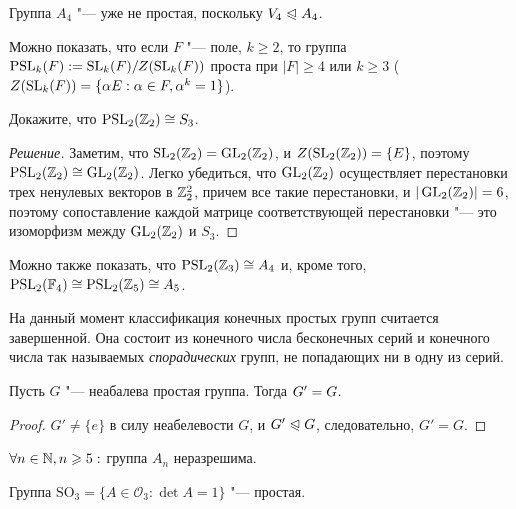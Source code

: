 \begin{note}
	Группа $A_4$ "--- уже не простая, поскольку $V_4 \trianglelefteqslant A_4$.
\end{note}

\begin{note}
	Можно показать, что если $F$ "--- поле, $k \ge 2$, то группа $\PSL_k(F) \hm{:=} \SL_k(F) / Z(\SL_k(F))$ проста при $|F| \ge 4$ или $k \ge 3$ ($Z(\operatorname{SL}_k(F)) = \{\alpha E: \alpha \in F, \alpha^k = 1\}$).
\end{note}

\begin{exercise}
	Докажите, что $\operatorname{PSL}_2(\mathbb{Z}_2) \cong S_3$.
\end{exercise}

\begin{proof}[Решение]
	Заметим, что $\operatorname{SL}_2(\mathbb{Z}_2)  = \operatorname{GL}_2(\mathbb{Z}_2)$, и $Z(\operatorname{SL}_2(\mathbb{Z}_2)) = \{E\}$, поэтому $\PSL_2(\Z_2) \hm\cong \GL_2(\Z_2)$. Легко убедиться, что $\operatorname{GL}_2(\mathbb{Z}_2)$ осуществляет перестановки трех ненулевых векторов в $\mathbb{Z}_2^2$, причем все такие перестановки, и $|\operatorname{GL}_2(\mathbb{Z}_2)| = 6$, поэтому сопоставление каждой матрице соответствующей перестановки "--- это изоморфизм между $\operatorname{GL}_2(\mathbb{Z}_2)$ и $S_3$.
\end{proof}

\begin{note}
	Можно также показать, что $\operatorname{PSL}_2(\mathbb{Z}_3) \cong A_4$ и, кроме того, $\PSL_2(\mathbb{F}_4) \hm\cong \PSL_2(\Z_5) \cong A_5$.
\end{note}

\begin{note}
	На данный момент классификация конечных простых групп считается завершенной. Она состоит из конечного числа бесконечных серий и конечного числа так называемых \textit{спорадических} групп, не попадающих ни в одну из серий.
\end{note}

\begin{proposition}
	Пусть $G$ "--- неабалева простая группа. Тогда $G' \hm= G$.
\end{proposition}

\begin{proof}
	$G' \ne \{e\}$ в силу неабелевости $G$, и $G' \trianglelefteqslant G$, следовательно, $G' = G$.
\end{proof}

\begin{corollary}
	$\forall n \in \mathbb{N}, n \geqslant 5:$ группа $A_n$ неразрешима.
\end{corollary}

\begin{theorem}
	Группа $\mathrm{SO}_3 = \{A \in \mathcal{O}_3: \det{A} = 1\}$ "--- простая.
\end{theorem}

